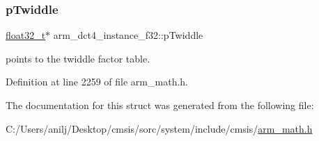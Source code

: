 \subsubsection{\texorpdfstring{p\+Twiddle}{pTwiddle}}
{\footnotesize\ttfamily \hyperlink{arm__math_8h_a4611b605e45ab401f02cab15c5e38715}{float32\+\_\+t}$\ast$ arm\+\_\+dct4\+\_\+instance\+\_\+f32\+::p\+Twiddle}

points to the twiddle factor table. 

Definition at line 2259 of file arm\+\_\+math.\+h.



The documentation for this struct was generated from the following file\+:\begin{DoxyCompactItemize}
\item 
C\+:/\+Users/anilj/\+Desktop/cmsis/sorc/system/include/cmsis/\hyperlink{arm__math_8h}{arm\+\_\+math.\+h}\end{DoxyCompactItemize}
